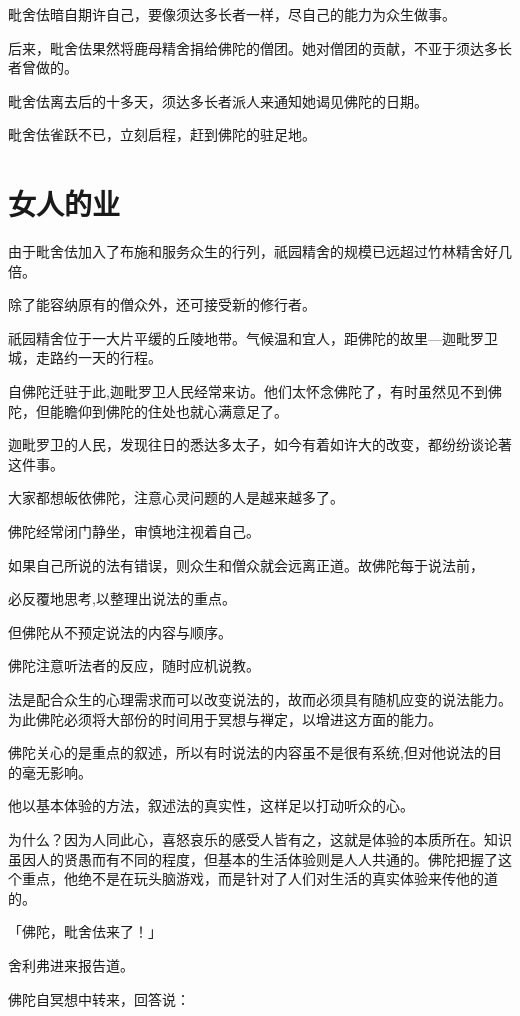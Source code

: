 \documentclass[twoside,openany]{book}
\begin{document}
毗舍佉暗自期许自己，要像须达多长者一样，尽自己的能力为众生做事。

后来，毗舍佉果然将鹿母精舍捐给佛陀的僧团。她对僧团的贡献，不亚于须达多长者曾做的。

毗舍佉离去后的十多天，须达多长者派人来通知她谒见佛陀的日期。

毗舍佉雀跃不已，立刻启程，赶到佛陀的驻足地。

\section{女人的业}\label{sec7.2}

由于毗舍佉加入了布施和服务众生的行列，祇园精舍的规模已远超过竹林精舍好几倍。

除了能容纳原有的僧众外，还可接受新的修行者。

祇园精舍位于一大片平缓的丘陵地带。气候温和宜人，距佛陀的故里—迦毗罗卫城，走路约一天的行程。

自佛陀迁驻于此,迦毗罗卫人民经常来访。他们太怀念佛陀了，有时虽然见不到佛陀，但能瞻仰到佛陀的住处也就心满意足了。

迦毗罗卫的人民，发现往日的悉达多太子，如今有着如许大的改变，都纷纷谈论著这件事。

大家都想皈依佛陀，注意心灵问题的人是越来越多了。

佛陀经常闭门静坐，审慎地注视着自己。

如果自己所说的法有错误，则众生和僧众就会远离正道。故佛陀每于说法前，

必反覆地思考,以整理出说法的重点。

但佛陀从不预定说法的内容与顺序。

佛陀注意听法者的反应，随时应机说教。

法是配合众生的心理需求而可以改变说法的，故而必须具有随机应变的说法能力。为此佛陀必须将大部份的时间用于冥想与禅定，以增进这方面的能力。

佛陀关心的是重点的叙述，所以有时说法的内容虽不是很有系统,但对他说法的目的毫无影响。

他以基本体验的方法，叙述法的真实性，这样足以打动听众的心。

为什么？因为人同此心，喜怒哀乐的感受人皆有之，这就是体验的本质所在。知识虽因人的贤愚而有不同的程度，但基本的生活体验则是人人共通的。佛陀把握了这个重点，他绝不是在玩头脑游戏，而是针对了人们对生活的真实体验来传他的道的。

「佛陀，毗舍佉来了！」

舍利弗进来报告道。

佛陀自冥想中转来，回答说：
\end{document}
